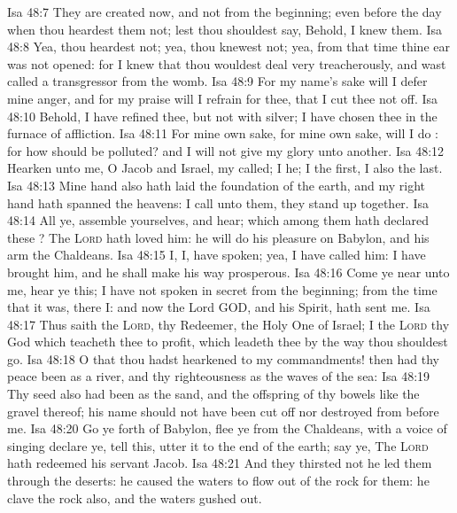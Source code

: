 \vs Isa 48:7 They are created now, and not from the beginning; even before the day when thou heardest them not; lest thou shouldest say, Behold, I knew them.
\vs Isa 48:8 Yea, thou heardest not; yea, thou knewest not; yea, from that time  thine ear was not opened: for I knew that thou wouldest deal very treacherously, and wast called a transgressor from the womb.
\vs Isa 48:9 For my name's sake will I defer mine anger, and for my praise will I refrain for thee, that I cut thee not off.
\vs Isa 48:10 Behold, I have refined thee, but not with silver; I have chosen thee in the furnace of affliction.
\vs Isa 48:11 For mine own sake,  for mine own sake, will I do : for how should  be polluted? and I will not give my glory unto another.
\vs Isa 48:12 Hearken unto me, O Jacob and Israel, my called; I  he; I  the first, I also  the last.
\vs Isa 48:13 Mine hand also hath laid the foundation of the earth, and my right hand hath spanned the heavens:  I call unto them, they stand up together.
\vs Isa 48:14 All ye, assemble yourselves, and hear; which among them hath declared these ? The \textsc{Lord} hath loved him: he will do his pleasure on Babylon, and his arm  the Chaldeans.
\vs Isa 48:15 I,  I, have spoken; yea, I have called him: I have brought him, and he shall make his way prosperous.
\vs Isa 48:16 Come ye near unto me, hear ye this; I have not spoken in secret from the beginning; from the time that it was, there  I: and now the Lord GOD, and his Spirit, hath sent me.
\vs Isa 48:17 Thus saith the \textsc{Lord}, thy Redeemer, the Holy One of Israel; I  the \textsc{Lord} thy God which teacheth thee to profit, which leadeth thee by the way  thou shouldest go.
\vs Isa 48:18 O that thou hadst hearkened to my commandments! then had thy peace been as a river, and thy righteousness as the waves of the sea:
\vs Isa 48:19 Thy seed also had been as the sand, and the offspring of thy bowels like the gravel thereof; his name should not have been cut off nor destroyed from before me.
\vs Isa 48:20 Go ye forth of Babylon, flee ye from the Chaldeans, with a voice of singing declare ye, tell this, utter it  to the end of the earth; say ye, The \textsc{Lord} hath redeemed his servant Jacob.
\vs Isa 48:21 And they thirsted not  he led them through the deserts: he caused the waters to flow out of the rock for them: he clave the rock also, and the waters gushed out.
